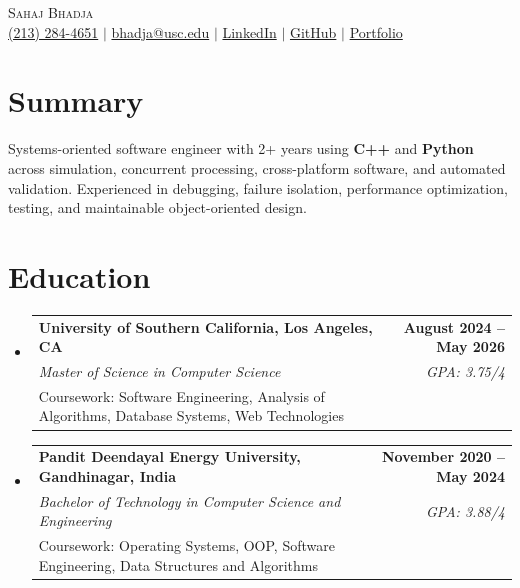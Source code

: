 \documentclass[letterpaper,10pt]{article}
\makeatletter
\newcommand{\resumeEduSubheading}[5]{\vspace{-1pt}\item\begin{tabular*}{1.0\textwidth}[t]{l@{\extracolsep{\fill}}r}\textbf{#1} & \textbf{\small #2} \\\textit{\small #3} & \textit{\small #4} \\\small #5 & \\\end{tabular*}\vspace{-4pt}}
\newcommand{\resumeSubHeadingListStart}{\begin{itemize}[leftmargin=0.0in,label={}]}
\newcommand{\resumeSubHeadingListEnd}{\end{itemize}}
\makeatother
\begin{document}
\begin{center}
  {\Huge \scshape Sahaj Bhadja} \\ \vspace{1pt}
  \small \href{tel:2132844651}{(213) 284-4651} $|$ \href{mailto:bhadja@usc.edu}{bhadja@usc.edu} $|$
  \href{https://www.linkedin.com/in/sahaj-bhadja/}{LinkedIn} $|$ \href{https://github.com/sahaj-bhadja}{GitHub} $|$ \href{https://sahaj-bhadja.github.io/}{Portfolio}
\end{center}
\vspace{-13pt}

\section{Summary}
\small Systems-oriented software engineer with 2+ years using \textbf{C++} and \textbf{Python} across simulation, concurrent processing, cross-platform software, and automated validation. Experienced in debugging, failure isolation, performance optimization, testing, and maintainable object-oriented design.

\section{Education}
\resumeSubHeadingListStart
  \resumeEduSubheading{University of Southern California, Los Angeles, CA}{August 2024 -- May 2026}{Master of Science in Computer Science}{GPA: 3.75/4}{Coursework: Software Engineering, Analysis of Algorithms, Database Systems, Web Technologies}
  \vspace{2pt}
  \resumeEduSubheading{Pandit Deendayal Energy University, Gandhinagar, India}{November 2020 -- May 2024}{Bachelor of Technology in Computer Science and Engineering}{GPA: 3.88/4}{Coursework: Operating Systems, OOP, Software Engineering, Data Structures and Algorithms}
\resumeSubHeadingListEnd
\end{document}
